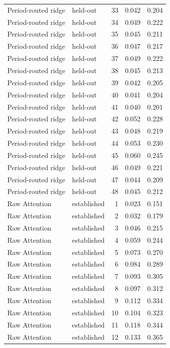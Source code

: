 \begin{tabular}{llrrr}
Period-routed ridge & held-out & 33 & 0.042 & 0.204 \\
Period-routed ridge & held-out & 34 & 0.049 & 0.222 \\
Period-routed ridge & held-out & 35 & 0.045 & 0.211 \\
Period-routed ridge & held-out & 36 & 0.047 & 0.217 \\
Period-routed ridge & held-out & 37 & 0.049 & 0.222 \\
Period-routed ridge & held-out & 38 & 0.045 & 0.213 \\
Period-routed ridge & held-out & 39 & 0.042 & 0.205 \\
Period-routed ridge & held-out & 40 & 0.041 & 0.204 \\
Period-routed ridge & held-out & 41 & 0.040 & 0.201 \\
Period-routed ridge & held-out & 42 & 0.052 & 0.228 \\
Period-routed ridge & held-out & 43 & 0.048 & 0.219 \\
Period-routed ridge & held-out & 44 & 0.053 & 0.230 \\
Period-routed ridge & held-out & 45 & 0.060 & 0.245 \\
Period-routed ridge & held-out & 46 & 0.049 & 0.221 \\
Period-routed ridge & held-out & 47 & 0.044 & 0.209 \\
Period-routed ridge & held-out & 48 & 0.045 & 0.212 \\
Raw Attention & established & 1 & 0.023 & 0.151 \\
Raw Attention & established & 2 & 0.032 & 0.179 \\
Raw Attention & established & 3 & 0.046 & 0.215 \\
Raw Attention & established & 4 & 0.059 & 0.244 \\
Raw Attention & established & 5 & 0.073 & 0.270 \\
Raw Attention & established & 6 & 0.084 & 0.289 \\
Raw Attention & established & 7 & 0.093 & 0.305 \\
Raw Attention & established & 8 & 0.097 & 0.312 \\
Raw Attention & established & 9 & 0.112 & 0.334 \\
Raw Attention & established & 10 & 0.104 & 0.323 \\
Raw Attention & established & 11 & 0.118 & 0.344 \\
Raw Attention & established & 12 & 0.133 & 0.365 \\

\end{tabular}
